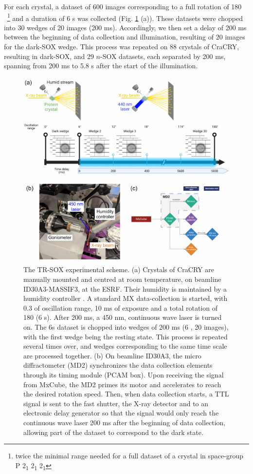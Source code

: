 For each crystal, a dataset of 600 images corresponding to a full rotation of  180 \degree\  \footnote{twice the minimal range needed for a full dataset of a crystal in space-group P 2\textsubscript{1} 2\textsubscript{1} 2\textsubscript{1}} and a duration of 6 s was collected (Fig. \ref{fig:TR-SOX_exp} (a)). These datasets were chopped into 30 wedges of 20 images (200 ms). Accordingly, we then set a delay of 200 ms between the beginning of data collection and illumination, resulting of 20 images for the dark-SOX wedge. This process was repeated on 88 crystals of CraCRY, resulting in dark-SOX, and 29 \(n\)-SOX datasets, each separated by 200 ms, spanning from 200 ms to 5.8 s after the start of the illumination.
\begin{figure}[H]
  \centering
  \includegraphics[width=\textwidth]{images/cracry/TR-SOX_exp.pdf}
  \hfill
  \caption{The TR-SOX experimental scheme. (a) Crystals of CraCRY are manually mounted and centred at room temperature, on beamline ID30A3-MASSIF3, at the ESRF. Their humidity is maintained by a humidity controller \parencite{sanchez-weatherbyImprovingDiffractionHumidity2009}. A standard MX data-collection is started, with 0.3 \degree of oscillation range, 10 ms of exposure and a total rotation of 180 \degree (6 s). After 200 ms, a 450 nm, continuous wave laser is turned on. The 6s dataset is chopped into wedges of 200 ms (6 \degree, 20 images), with the first wedge being the resting state. This process is repeated several times over, and wedges corresponding to the same time scale are processed together. (b) On beamline ID30A3, the micro diffractometer (MD2) synchronizes the data collection elements through its timing module (PCAM box). Upon receiving the signal from MxCube, the MD2 primes its motor and accelerates to reach the desired rotation speed. Then, when data collection starts, a TTL signal is sent to the fast shutter, the X-ray detector and to an electronic delay generator so that the signal would only reach the continuous wave laser 200 ms
after the beginning of data collection, allowing part of the dataset to correspond to the dark state.}\label{fig:TR-SOX_exp}
\end{figure}
